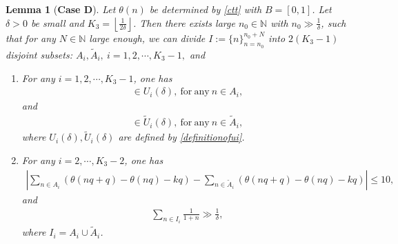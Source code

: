\documentclass[12pt]{amsart}
\newcommand{\abs}[1]{\left\lvert #1 \right\rvert}
\theoremstyle{plain}
\newtheorem{lemma}[theorem]{Lemma}
\theoremstyle{definition}
\begin{document}
\begin{lemma}[\textbf{Case D}]\label{caseD}
	Let $\theta(n)$ be determined by \eqref{ctt} with $B=[0,1]$. Let $\delta>0$ be small and $K_3=\left \lfloor \frac{1}{2\delta} \right \rfloor$. Then there exists large $n_0\in\mathbb{N}$ with $n_0\gg \frac{1}{\delta}$, such that for any  $N\in\mathbb{N}$ large enough, we can divide $I:=\{n\}_{n=n_0}^{n_0+N}$ into $2(K_3-1)$ disjoint subsets: $A_i, \tilde{{A}}_i,\ i=1,2,\cdots,K_3-1,$ and
	\begin{enumerate}
		\item For any $i=1,2,\cdots,K_3-1$, one has
		\begin{align}
			[\theta(nq)]\in U_i(\delta),\ \mathrm{for\ any}\ n\in A_i,\label{aiinuitheta}
		\end{align}
		and 
		\begin{align}
			[\theta(nq)]\in \tilde{U}_i(\delta),\ \mathrm{for\ any}\ n\in \tilde{A}_i,\label{aiinuitildetheta}
		\end{align}
		where $U_i(\delta),\tilde{U}_i(\delta)$ are defined by \eqref{definitionofui}.
		\item For any $i=2,\cdots,K_3-2$, one has
		\begin{align}
			\abs{\sum_{n\in A_i}(\theta(nq+q)-\theta(nq)-kq)-\sum_{n\in \tilde{A}_i}(\theta(nq+q)-\theta(nq)-kq)}\leq 10,\label{aiminusbileq10theta}
		\end{align}
		and 
		\begin{align}
			\sum_{n\in I_i}\frac{1}{1+n}\gg \frac{1}{\delta},\label{Iifractionlargetheta}
		\end{align}
		where $I_i=A_i\cup \tilde{{A}}_i$.
	\end{enumerate} 
\end{lemma}
\end{document}
